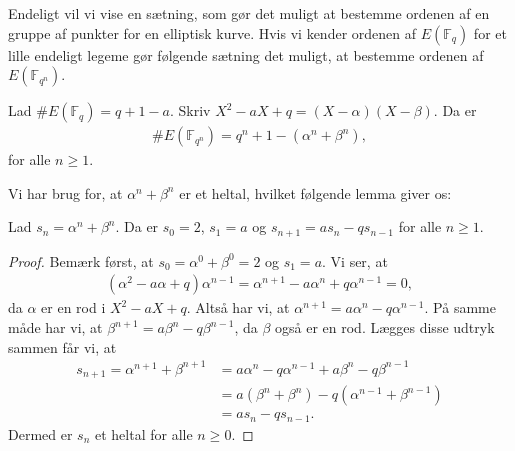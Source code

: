 Endeligt vil vi vise en sætning, som gør det muligt at bestemme ordenen af en gruppe af punkter for en elliptisk kurve. Hvis vi kender ordenen af $E(\mathbb{F}_q)$ for et lille endeligt legeme gør følgende sætning det muligt, at bestemme ordenen af $E(\mathbb{F}_{q^n})$.

\begin{thm}
\label{count}
Lad $\#E(\mathbb{F}_q) = q + 1 - a$. Skriv $X^2 - aX + q= (X-\alpha)(X-\beta)$. Da er
\begin{align*}
	\#E(\mathbb{F}_{q^n}) = q^n + 1 - (\alpha^n + \beta^n),
\end{align*}
for alle $n \geq 1$.
\end{thm}

Vi har brug for, at $\alpha^n + \beta^n$ er et heltal, hvilket følgende lemma giver os:

\begin{lemma}
Lad $s_n = \alpha^n + \beta^n$. Da er $s_0=2$, $s_1=a$ og $s_{n+1}=as_n - qs_{n-1}$ for alle $n \geq 1$.
\end{lemma}
\begin{proof}
Bemærk først, at $s_0 = \alpha^0 + \beta^0 = 2$ og $s_1 = a$.
Vi ser, at 
\begin{align*}
	(\alpha^2 - a\alpha + q) \alpha^{n-1} = \alpha^{n+1} - a \alpha^n + q\alpha^{n-1} = 0,
\end{align*}
da $\alpha$ er en rod i $X^2 - aX + q$. Altså har vi, at $\alpha^{n+1}=a \alpha^n - q\alpha^{n-1}$. På samme måde har vi, at $\beta^{n+1}=a \beta^n - q \beta^{n-1}$, da $\beta$ også er en rod. Lægges disse udtryk sammen får vi, at
\begin{align*}
	s_{n+1} = \alpha^{n+1} + \beta^{n+1} &= a \alpha^n - q \alpha^{n-1} + a \beta^n - q \beta^{n-1} \\
	&= a (\beta^n + \beta^n) - q (\alpha^{n-1} + \beta^{n-1}) \\
	&= a s_n - q s_{n-1}.
\end{align*}
Dermed er $s_n$ et heltal for alle $n \geq 0$.
\end{proof}

